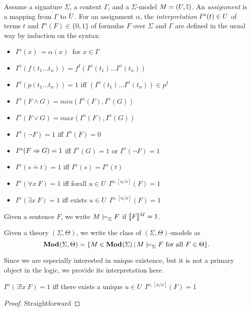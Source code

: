 \documentclass{article}
\begin{document}
\begin{definition}\label{def:semantics}
Assume a signature $\Sigma$, a context $\Gamma$, and a $\Sigma$-model $M=(U,\mathbb{I})$. An \emph{assignment} is a mapping from $\Gamma$ to $U$. For an assignment $\alpha$, the \emph{interpretation} $I^\alpha(t)\in U$ of terms $t$ and $I^\alpha(F)\in\{0,1\}$ of formulas $F$ over $\Sigma$ and $\Gamma$ are defined in the usual way by induction on the syntax:
\begin{itemize}
\item $I^\alpha(x)\ =\alpha(x)\ $ for $x\in\Gamma$
\item $I^\alpha(f(t_1\dots t_n))= f^I(I^\alpha(t_1)\dots I^\alpha(t_n))$
\item $I^\alpha(p(t_1\dots t_n))=1$ iff $(I^\alpha(t_1)\dots I^\alpha(t_n))\in p^I$
\item $I^\alpha(F\wedge G)= min(I^\alpha(F),I^\alpha(G))$
\item $I^\alpha(F\vee G)= max(I^\alpha(F),I^\alpha(G))$
\item $I^\alpha(\neg F)=1$ iff $I^\alpha(F)=0$
\item $I^\alpha(F\Rightarrow G)=1$ iff $I^\alpha(G)=1$ or $I^\alpha(\neg F)=1$
\item $I^\alpha(s\doteq t)=1$ iff $I^\alpha(s)=I^\alpha(t)$
\item $I^\alpha(\forall x\ F)=1$ iff forall $u\in U\ \ I^{\alpha,[u/x]}(F)=1$
\item $I^\alpha(\exists x\ F)=1$ iff exists $u\in U\ \ I^{\alpha,[u/x]}(F)=1$
\end{itemize}

Given a sentence $F$, we write $M\models^{}_{\Sigma}F$ if $\llbracket F\rrbracket^{M}=1$.

Given a theory $(\Sigma,\Theta)$, we write the class of $(\Sigma,\Theta)$-models as
\[{\mathbf{Mod}^{}}(\Sigma,\Theta) = \{M\in {\mathbf{Mod}^{}}(\Sigma)\,|\,M\models^{}_{\Sigma}F \textrm{ for all } F\in\Theta\}.\]
\end{definition}

Since we are especially interested in unique existence, but it is not a primary object in the logic, we provide its interpretation here.
\begin{lemma}
\item $I^\alpha(\exists! x\ F)=1$ iff there exists a unique $u\in U\ \ I^{\alpha,[u/x]}(F)=1$\\
\end{lemma}

\begin{proof}
Straightforward \end{proof}
\end{document}
